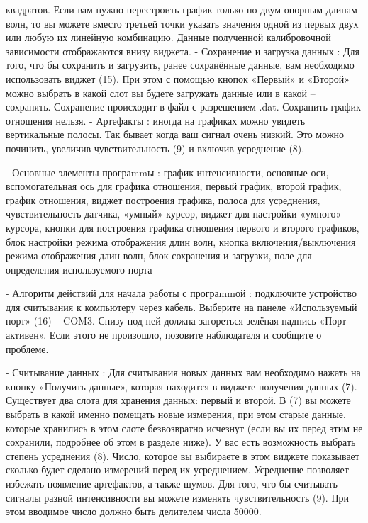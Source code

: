 \documentclass[11pt,a4paper]{article}
\begin{document}
квадратов. Если вам нужно перестроить график только по двум опорным длинам волн, то вы можете вместо третьей точки указать значения одной из первых двух или любую их линейную комбинацию. Данные полученной калибровочной зависимости отображаются внизу виджета. - Сохранение и загрузка данных : Для того, что бы сохранить и загрузить, ранее сохранённые данные, вам необходимо использовать виджет (15). При этом с помощью кнопок «Первый» и «Второй» можно выбрать в какой слот вы будете загружать данные или в какой – сохранять. Сохранение происходит в файл с разрешением .dat. Сохранить график отношения нельзя. - Артефакты : иногда на графиках можно увидеть вертикальные полосы. Так бывает когда ваш сигнал очень низкий. Это можно починить, увеличив чувствительность (9) и включив усреднение (8).

- Основные элементы програmmы : график интенсивности, основные оси, вспомогательная ось для графика отношения, первый график, второй график, график отношения, виджет построения графика, полоса для усреднения, чувствительность датчика, «умный» курсор, виджет для настройки «умного» курсора, кнопки для построения графика отношения первого и второго графиков, блок настройки режима отображения длин волн, кнопка включения/выключения режима отображения длин волн, блок сохранения и загрузки, поле для определения используемого порта

- Алгоритм действий для начала работы с програmmой : подключите устройство для считывания к компьютеру через кабель. Выберите на панеле «Используемый порт» (16) – COM3. Снизу под ней должна загореться зелёная надпись «Порт активен». Если этого не произошло, позовите наблюдателя и сообщите о проблеме.

- Считывание данных : Для считывания новых данных вам необходимо нажать на кнопку «Получить данные», которая находится в виджете получения данных (7). Существует два слота для хранения данных: первый и второй. В (7) вы можете выбрать в какой именно помещать новые измерения, при этом старые данные, которые хранились в этом слоте безвозвратно исчезнут (если вы их перед этим не сохранили, подробнее об этом в разделе ниже). У вас есть возможность выбрать степень усреднения (8). Число, которое вы выбираете в этом виджете показывает сколько будет сделано измерений перед их усреднением. Усреднение позволяет избежать появление артефактов, а также шумов. Для того, что бы считывать сигналы разной интенсивности вы можете изменять чувствительность (9). При этом вводимое число должно быть делителем числа 50000.
\end{document}
